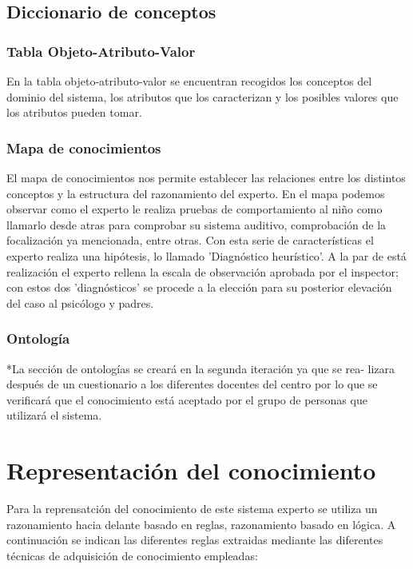 \documentclass[letterpaper,12pt]{article}
\begin{document}
\subsection{Diccionario de conceptos}
\subsubsection{Tabla Objeto-Atributo-Valor}
En la tabla objeto-atributo-valor se encuentran recogidos los conceptos
del dominio del sistema, los atributos que los caracterizan y los posibles valores que los atributos pueden tomar.
\subsubsection{Mapa de conocimientos}
El mapa de conocimientos nos permite establecer las relaciones entre los
distintos conceptos y la estructura del razonamiento del experto.
En el mapa podemos observar como el experto le realiza pruebas de comportamiento al niño como llamarlo desde atras para comprobar su sistema auditivo, comprobación de la focalización ya mencionada, entre otras. Con esta serie de características el experto realiza una hipótesis, lo llamado ’Diagnóstico heurístico’. A la par de está realización el experto rellena la escala de observación aprobada por el inspector; con estos dos ’diagnósticos’ se procede a la elección para su posterior elevación del caso al psicólogo y padres.
\subsubsection{Ontología}
*La sección de ontologías se creará en la segunda iteración ya que se rea-
lizara después de un cuestionario a los diferentes docentes del centro por lo que se verificará que el conocimiento está aceptado por el grupo de personas que utilizará el sistema.
\section{Representación del conocimiento}
Para la reprensatción del conocimiento de este sistema experto se utiliza
un razonamiento hacia delante basado en reglas, razonamiento basado en
lógica. A continuación se indican las diferentes reglas extraidas mediante las diferentes técnicas de adquisición de conocimiento empleadas: \\
\end{document}
